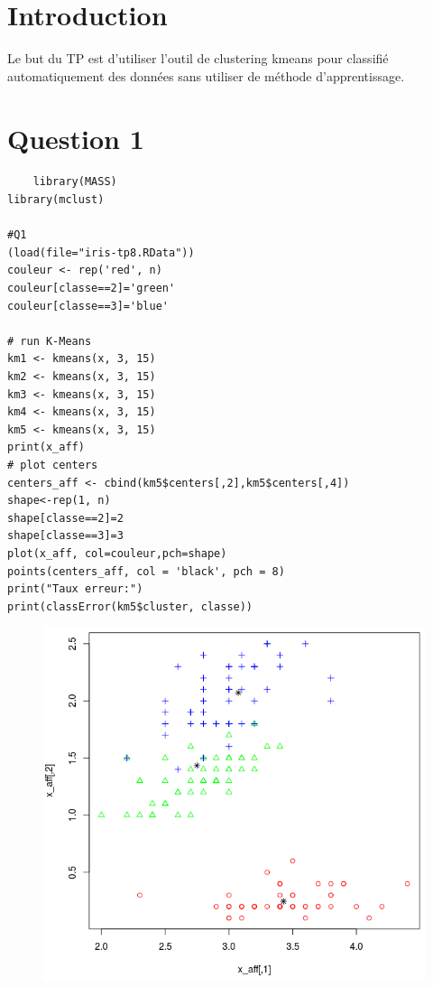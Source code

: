 \documentclass[a4paper,12pt]{report}
\begin{document}


\setcounter{page}{1} 
\newpage

\section*{Introduction}

Le but du TP est d'utiliser l'outil de clustering kmeans pour classifié automatiquement des données sans utiliser de méthode d'apprentissage.
	
\section*{Question 1}

\begin{lstlisting}
	library(MASS)
library(mclust)

#Q1
(load(file="iris-tp8.RData"))
couleur <- rep('red', n)
couleur[classe==2]='green'
couleur[classe==3]='blue'

# run K-Means
km1 <- kmeans(x, 3, 15)
km2 <- kmeans(x, 3, 15)
km3 <- kmeans(x, 3, 15)
km4 <- kmeans(x, 3, 15)
km5 <- kmeans(x, 3, 15)
print(x_aff)
# plot centers
centers_aff <- cbind(km5$centers[,2],km5$centers[,4])
shape<-rep(1, n) 
shape[classe==2]=2
shape[classe==3]=3
plot(x_aff, col=couleur,pch=shape)
points(centers_aff, col = 'black', pch = 8)
print("Taux erreur:")
print(classError(km5$cluster, classe))
\end{lstlisting}


\begin{figure}[!ht]
	\center
	\includegraphics[scale=0.3]{image/q1.png}
\end{figure}
\end{document}
